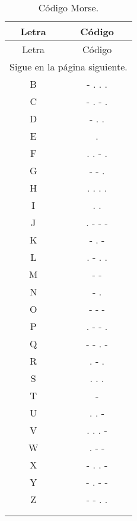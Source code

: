\begin{longtable}{c c}

\hline
Letra & Código \\
\hline \hline
\endfirsthead

\hline
Letra & Código \\
\hline \hline
\endhead

\multicolumn{2}{c}{Sigue en la página siguiente.}
\endfoot

\endlastfoot

A & . -\\
\hline
B & - . . .\\
\hline
C & - . - .\\
\hline
D & - . .\\
\hline
E & .\\
\hline
F & . . - .\\
\hline
G & - - .\\
\hline
H & . . . .\\
\hline
I & . .\\
\hline
J & . - - -\\
\hline
K & - . -\\
\hline
L & . - . .\\
\hline
M & - -\\
\hline
N & - .\\
\hline
O & - - -\\
\hline
P & . - - .\\
\hline
Q & - - . -\\
\hline
R & . - .\\
\hline
S & . . .\\
\hline
T & -\\
\hline
U & . . -\\
\hline
V & . . . -\\
\hline
W & . - -\\
\hline
X & - . . -\\
\hline
Y & - . - -\\
\hline
Z & - - . .\\
\hline
\\ %
\caption{Código Morse.}
\label{ta:morse}
\end{longtable}
